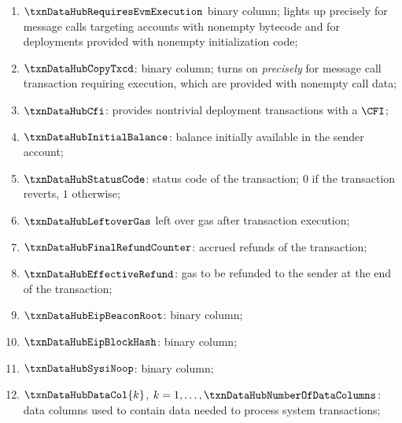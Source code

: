 \begin{enumerate}
	\item
		\markAsPartiallyJustifiedHere{}
		$\txnDataHubRequiresEvmExecution$
		binary column;
		lights up precisely for message calls targeting accounts with nonempty bytecode
		and for deployments provided with nonempty initialization code;
	\item
		\markAsJustifiedHere{}
		$\txnDataHubCopyTxcd$:
		binary column;
		turns on \emph{precisely}
		for message call transaction
		requiring \evm{} execution,
		which are provided with nonempty call data;
	\item
		\markAsExtractedFromHub{}
		$\txnDataHubCfi$:
		provides nontrivial deployment transactions with a $\CFI$;
	\item
		\markAsExtractedFromHub{}
		$\txnDataHubInitialBalance$:
		balance initially available in the sender account;
	\item
		\markAsExtractedFromHub{}
		$\txnDataHubStatusCode$:
		status code of the transaction;
		$0$ if the transaction reverts,
		$1$ otherwise;
	\item
		\markAsExtractedFromHub{}
		$\txnDataHubLeftoverGas$
		left over gas after transaction execution;
	\item
		\markAsExtractedFromHub{}
		$\txnDataHubFinalRefundCounter$:
		accrued refunds of the transaction;
	\item
		\markAsJustifiedHere{}
		$\txnDataHubEffectiveRefund$:
		gas to be refunded to the sender at the end of the transaction;
	\item
		\markAsExtractedFromHub{}
		$\txnDataHubEipBeaconRoot$:
		binary column;
	\item
		\markAsExtractedFromHub{}
		$\txnDataHubEipBlockHash$:
		binary column;
	\item
		\markAsExtractedFromHub{}
		$\txnDataHubSysiNoop$:
		binary column;
	\item
		\markAsExtractedFromHub{}
		$\txnDataHubDataCol{k}$,
		$k = 1, \dots, \txnDataHubNumberOfDataColumns$:
		data columns used to contain data needed to process system transactions;
\end{enumerate}


